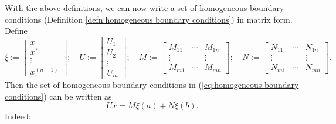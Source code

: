 \documentclass[11pt, oneside, a4paper]{article}
\begin{document}
With the above definitions, we can now write a set of homogeneous boundary conditions (Definition \ref{defn:homogeneous boundary conditions}) in matrix form. Define
\[
    \xi:= \begin{bmatrix}x\\ x'\\ \vdots \\ x^{(n-1)}
    \end{bmatrix};
        \quad
    U := \begin{bmatrix}U_1\\ U_2\\ \vdots \\ U_m
    \end{bmatrix};
        \quad
    M := \begin{bmatrix}
        M_{11} & \cdots & M_{1n}\\
        \vdots &  & \vdots\\
        M_{m1} & \cdots & M_{mn}
    \end{bmatrix};
    \quad
    N := \begin{bmatrix}
        N_{11} & \cdots & N_{1n}\\
        \vdots &  & \vdots\\
        N_{m1} & \cdots & N_{mn}
    \end{bmatrix}.
\]
Then the set of homogeneous boundary conditions in (\ref{eq:homogeneous boundary conditions}) can be written as
\[Ux = M\xi(a) + N\xi(b).\]
Indeed:
\end{document}
